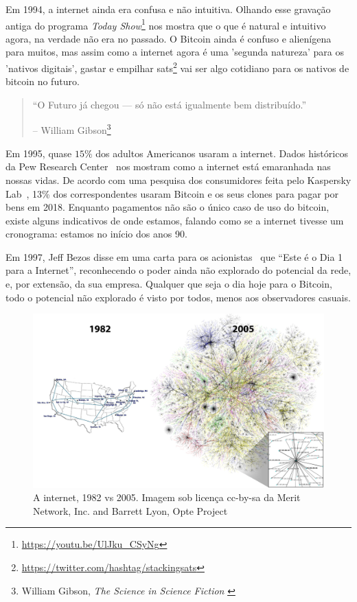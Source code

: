 Em 1994, a internet ainda era confusa e não intuitiva. Olhando esse gravação antiga
do programa  \textit{Today Show}\footnote{\url{https://youtu.be/UlJku_CSyNg}} nos mostra que o que é 
natural e intuitivo agora, na verdade não era no passado. O Bitcoin ainda é confuso e alienígena 
para muitos, mas assim como a internet agora é uma 'segunda natureza' para os 'nativos digitais', 
gastar e empilhar sats\footnote{\url{https://twitter.com/hashtag/stackingsats}} vai ser algo 
cotidiano para os nativos de bitcoin no futuro.

\begin{quotation}\begin{samepage}
\enquote{O Futuro já chegou --- só não está igualmente bem distribuído.}
\begin{flushright} -- William Gibson\footnote{William Gibson, \textit{The Science in Science Fiction} \cite{william-gibson}}
\end{flushright}\end{samepage}\end{quotation}

Em 1995, quase $15\%$ dos adultos Americanos usaram a internet. 
Dados históricos da Pew Research Center~\cite{pew-research} nos mostram como a internet está 
emaranhada nas nossas vidas. De acordo com uma pesquisa dos consumidores feita pelo 
Kaspersky Lab~\cite{web:kaspersky}, 13\% dos correspondentes usaram Bitcoin e os seus clones para pagar por 
bens em 2018. Enquanto pagamentos não são o único caso de uso do bitcoin, existe alguns indicativos de onde 
estamos, falando como se a internet tivesse um cronograma: estamos no início dos anos 90.

Em 1997, Jeff Bezos disse em uma carta para os acionistas~\cite{bezos-letter} que
\enquote{Este é o Dia 1 para a Internet}, reconhecendo o poder ainda não explorado
do potencial da rede, e, por extensão, da sua empresa. Qualquer que seja o dia hoje para o Bitcoin, 
todo o potencial não explorado é visto por todos, menos aos observadores casuais. 

\begin{figure}
  \includegraphics{assets/images/internet-evolution-white-dates.png}
  \caption{A internet, 1982 vs 2005. Imagem sob licença cc-by-sa da Merit Network, Inc. and Barrett Lyon, Opte Project}
  \label{fig:internet-evolution-white-dates}
\end{figure}


